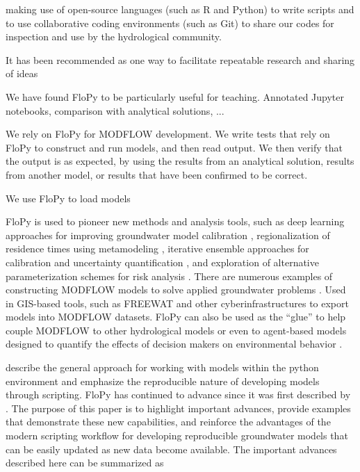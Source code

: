 \documentclass[11pt, oneside]{article}   	%
\begin{document}
making use of open-source languages (such as R and Python) to write scripts and to use collaborative coding environments (such as Git) to share our codes for inspection and use by the hydrological community.

It has been recommended as one way to facilitate repeatable research and sharing of ideas \citep{fienen2016}

We have found FloPy to be particularly useful for teaching.  Annotated Jupyter notebooks, comparison with analytical solutions, ...

We rely on FloPy for MODFLOW development.  We write tests that rely on FloPy to construct and run models, and then read output.  We then verify that the output is as expected, by using the results from an analytical solution, results from another model, or results that have been confirmed to be correct.

We use FloPy to load models

 FloPy is used to pioneer new methods and analysis tools, such as deep learning approaches for improving groundwater model calibration \citep{sun2018, zhou2021}, regionalization of residence times using metamodeling \citep{starn2018}, iterative ensemble approaches for calibration and uncertainty quantification \citep{white2018ies}, and exploration of alternative parameterization schemes for risk analysis \citep{knowling2019}. There are numerous examples of constructing MODFLOW models to solve applied groundwater problems \citep{befus2017, vanengelen2018, ebeling2019, zipper2019, befus2020}.  Used in GIS-based tools, such as FREEWAT \citep{freewat2018} and other cyberinfrastructures \citep{essawy2018} to export models into MODFLOW datasets.  FloPy can also be used as the ``glue'' to help couple MODFLOW to other hydrological models \citep{burek2020} or even to agent-based models designed to quantify the effects of decision makers on environmental behavior \citep{jaxarozen2019}. 

\cite{bakker2016scripting} describe the general approach for working with models within the python environment and emphasize the reproducible nature of developing models through scripting.  FloPy has continued to advance since it was first described by \cite{bakker2016scripting}. The purpose of this paper is to highlight important advances, provide examples that demonstrate these new capabilities, and reinforce the advantages of the modern scripting workflow for developing reproducible groundwater models that can be easily updated as new data become available.  The important advances described here can be summarized as
\end{document}
